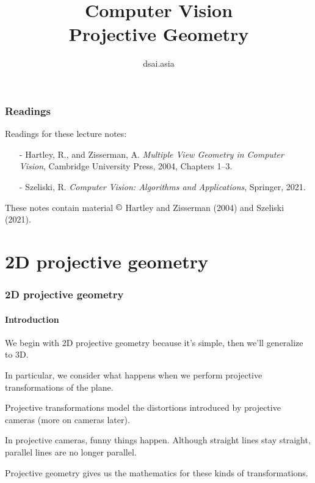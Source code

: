\documentclass[aspectratio=169]{beamer}
\title[Computer Vision]{Computer Vision\\Projective Geometry}
\author{dsai.asia}
\institute[]{Asia Data Science and Artificial Intelligence Master's Program}
\date{}
\begin{document}


\frame{\titlepage}

%

\begin{frame}
\frametitle{Readings}

Readings for these lecture notes:
\begin{itemize}
\item[-] Hartley, R., and Zisserman, A. {\em Multiple View Geometry in
    Computer Vision}, Cambridge University Press, 2004, Chapters 1--3.
\item[-] Szeliski, R. \textit{Computer Vision: Algorithms and Applications},
    Springer, 2021.
\end{itemize}

\medskip

These notes contain material $\copyright$ Hartley and Zisserman
(2004) and Szeliski (2021).

\end{frame}

\section{2D projective geometry}


\begin{frame}
\frametitle{2D projective geometry}
\framesubtitle{Introduction}

We begin with 2D projective geometry because it's simple, then we'll
generalize to 3D.

\medskip

In particular, we consider \alert{what happens when we perform
projective transformations of the plane}.

\medskip

\alert{Projective transformations} model the distortions introduced by
\alert{projective cameras} (more on cameras later).

\medskip

In projective cameras, funny things happen.  Although straight lines
stay straight, parallel lines are no longer parallel.

\medskip

Projective geometry gives us the mathematics for these kinds of
transformations.

\end{frame}
\end{document}
